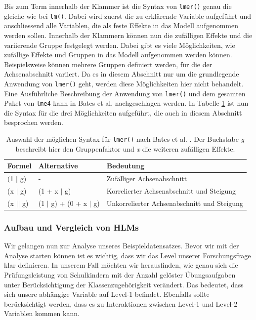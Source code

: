 \documentclass[12pt, a4paper]{article}\usepackage[]{graphicx}\usepackage[]{color}
\begin{document}
Bis zum Term innerhalb der Klammer ist die Syntax von \texttt{lmer()} genau die gleiche wie bei \texttt{lm()}. Dabei wird zuerst die zu erklärende Variable aufgeführt und anschliessend alle Variablen, die als feste Effekte in das Modell aufgenommen werden sollen. Innerhalb der Klammern können nun die zufälligen Effekte und die variierende Gruppe festgelegt werden. Dabei gibt es viele Möglichkeiten, wie zufällige Effekte und Gruppen in das Modell aufgenommen werden können. Beispielsweise können mehrere Gruppen definiert werden, für die der Achsenabschnitt variiert. Da es in diesem Abschnitt nur um die grundlegende Anwendung von \texttt{lmer()} geht, werden diese Möglichkeiten hier nicht behandelt. Eine Ausführliche Beschreibung der Anwendung von \texttt{lmer()} und dem gesamten Paket von \texttt{lme4} kann in Bates et al. \citeyearpar{batesetal2015lme4} nachgeschlagen werden. In Tabelle \ref{tab:lmersyntax} ist nun die Syntax für die drei Möglichkeiten aufgeführt, die auch in diesem Abschnitt besprochen werden.
\begin{table}[ht] 
\centering
\begin{threeparttable}
\caption{Auswahl der möglichen Syntax für \texttt{lmer()} nach Bates et al. \citeyearpar{batesetal2015lme4}. Der Buchstabe \textit{g} beschreibt hier den Gruppenfaktor und \textit{x} die weiteren zufälligen Effekte.}
\begin{tabular}{lll}
 	\toprule
	Formel & Alternative & Bedeutung\\ 
  	\midrule
	(1 $|$ g)	& - 		& Zufälliger Achsenabschnitt \\
	(x $|$ g) 	& (1 + x $|$ g)	& Korrelierter Achsenabschnitt und Steigung \\
	(x $||$ g) & (1 $|$ g) + (0 + x $|$ g)	& Unkorrelierter Achsenabschnitt und Steigung\\
  	\bottomrule
\end{tabular}
\label{tab:lmersyntax}
\end{threeparttable}
\end{table}

\subsubsection{Aufbau und Vergleich von HLMs} \label{section:hlm_r}
\singlespacing

Wir gelangen nun zur Analyse unseres Beispieldatensatzes. Bevor wir mit der Analyse starten können ist es wichtig, dass wir das Level unserer Forschungsfrage klar definieren. In unserem Fall möchten wir herausfinden, wie genau sich die Prüfungsleistung von Schulkindern mit der Anzahl gelöster Übungsaufgaben unter Berücksichtigung der Klassenzugehörigkeit verändert. Das bedeutet, dass sich unsere abhängige Variable auf Level-1 befindet. Ebenfalls sollte berücksichtigt werden, dass es zu Interaktionen zwischen Level-1 und Level-2 Variablen kommen kann.
\end{document}
